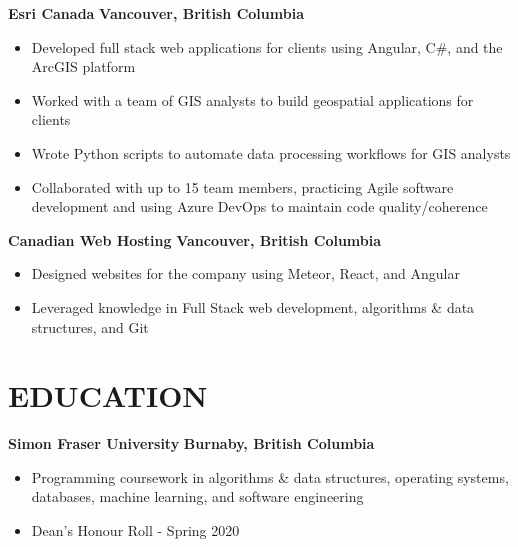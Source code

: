 \documentclass[margin,line]{resume}
\begin{document}
\begin{resume}
    \textbf{\listing Esri Canada} \hfill \textbf{Vancouver, British Columbia}\vspace{2mm}\\\vspace{1mm}%
    \begin{itemize}[noitemsep,topsep=3pt,before=\textsl{Developer} \hfill \textsl{June 2019 -- December 2021},after=\vspace{\medskipamount}]
    \item Developed full stack web applications for clients using Angular, C\#, and the ArcGIS platform
    \item Worked with a team of GIS analysts to build geospatial applications for clients
    \item Wrote Python scripts to automate data processing workflows for GIS analysts
    \item Collaborated with up to 15 team members, practicing Agile software development and using Azure DevOps to maintain code quality/coherence
    \end{itemize}

    \textbf{\listing Canadian Web Hosting} \hfill \textbf{Vancouver, British Columbia}\vspace{2mm}\\\vspace{1mm}%
    \begin{itemize}[noitemsep,before=\textsl{Junior Programmer} \hfill \textsl{May 2018 -- February 2019},topsep=3pt]
    \item Designed websites for the company using Meteor, React, and Angular
    \item Leveraged knowledge in Full Stack web development, algorithms \& data structures, and Git
    \end{itemize}

\sectionline

    \section{\mysidestyle \textbf{\large{E}\small{DUCATION}}}

    \textbf{\listing Simon Fraser University} \hfill \textbf{Burnaby, British Columbia} \vspace{2mm}\\
    \begin{itemize}[noitemsep,topsep=3pt,before=\textsl{Bachelor of Science (Computing Science Major)} \hfill \textsl{January 2018 -- April 2020}\vspace{-3mm}\\\vspace{-1mm},after=\vspace{\medskipamount}]
    \item Programming coursework in algorithms \& data structures, operating systems, databases, machine
    learning, and software engineering
    \item Dean’s Honour Roll - Spring 2020
    \end{itemize}
    

\end{resume}
\end{document}

